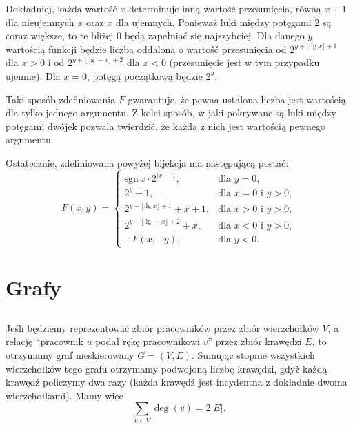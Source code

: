 Dokładniej, każda wartość $x$ determinuje inną wartość przesunięcia, równą $x+1$ dla nieujemnych $x$ oraz $x$ dla ujemnych. Ponieważ luki między potęgami $2$ są coraz większe, to te bliżej $0$ będą zapełniać się najszybciej. Dla danego $y$ wartością funkcji będzie liczba oddalona o wartość przesunięcia od $2^{y+\lfloor\lg x\rfloor+1}$ dla $x>0$ i od $2^{y+\lfloor\lg -x\rfloor+2}$ dla $x<0$ (przesunięcie jest w tym przypadku ujemne). Dla $x=0$, potęgą początkową będzie $2^y$.

Taki sposób zdefiniowania $F$ gwarantuje, że pewna ustalona liczba jest wartością dla tylko jednego argumentu. Z kolei sposób, w jaki pokrywane są luki między potęgami dwójek pozwala twierdzić, że każda z nich jest wartością pewnego argumentu.

Ostatecznie, zdefiniowana powyżej bijekcja ma następującą postać:
\[
	F(x,y)=\left\lbrace\begin{array}{ll}
		\mathrm{sgn}\,x\cdot 2^{|x|-1}, & \mbox{dla }y=0, \\
		2^y+1, & \mbox{dla }x=0\mbox{ i }y>0, \\
		2^{y+\lfloor\lg x\rfloor+1}+x+1, & \mbox{dla }x>0\mbox{ i }y>0, \\
		2^{y+\lfloor\lg -x\rfloor+2}+x, & \mbox{dla }x<0\mbox{ i }y>0, \\
		-F(x,-y), & \mbox{dla }y<0.
	\end{array}\right.
\]

\section{Grafy}

\subsection{} %
Jeśli będziemy reprezentować zbiór pracowników przez zbiór wierzchołków $V$, a relację ``pracownik $u$ podał rękę pracownikowi $v$'' przez zbiór krawędzi $E$, to otrzymamy graf nieskierowany $G=(V,E)$. Sumując stopnie wszystkich wierzchołków tego grafu otrzymamy podwojoną liczbę krawędzi, gdyż każdą krawędź policzymy dwa razy (każda krawędź jest incydentna z dokładnie dwoma wierzchołkami). Mamy więc
\[
	\sum_{v\in V}\deg(v)=2|E|.
\]

